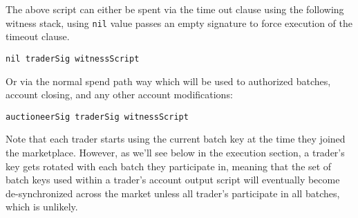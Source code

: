 \documentclass[10pt,a4paper]{article}
\theoremstyle{definition}
\begin{document}

The above script can either be spent via the time out clause using the
following witness stack, using \texttt{nil} value passes an empty signature to
force execution of the timeout clause.
\begin{verbatim}
nil traderSig witnessScript
\end{verbatim}

Or via the normal spend path way which will be used to authorized batches,
account closing, and any other account modifications:
\begin{verbatim}
auctioneerSig traderSig witnessScript
\end{verbatim}

Note that each trader starts using the current batch key at the time they
joined the marketplace. However, as we'll see below in the execution section, a
trader's key gets rotated with each batch they participate in, meaning that the
set of batch keys used within a trader's account output script will eventually
become de-synchronized across the market unless all trader's participate in all
batches, which is unlikely. \\
\end{document}
